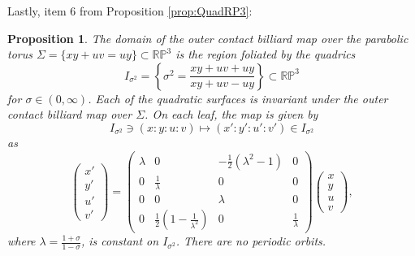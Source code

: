 \documentclass{article}
\newtheorem{prop}{Proposition}[section]
\begin{document}
\begin{appendix}



Lastly, item 6 from Proposition \ref{prop:QuadRP3}:

\begin{prop}
\label{prop:ParTori}
    The domain of the outer contact billiard map over the parabolic torus $\Sigma = \{xy+uv = uy\}\subset \mathbb{RP}^3$ is the region foliated by the quadrics  
    \[I_{\sigma^2}=\left\{ \sigma^2 = \frac{xy + uv + uy}{xy + uv - uy} \right\}\subset \mathbb{RP}^3\]
    for $\sigma\in (0,\infty)$. Each of the quadratic surfaces is invariant under the outer contact billiard map over $\Sigma$. On each leaf, the map is given by 
    \[ I_{\sigma^2}\ni (x: y: u: v)\mapsto (x':y':u':v')\in I_{\sigma^2}\]
    as
    \[\begin{pmatrix}
        x'\\
        y'\\
        u'\\
        v'
    \end{pmatrix} = \begin{pmatrix}
        \lambda & 0 & -\frac12(\lambda^2 - 1) & 0\\
        0 & \frac{1}{\lambda} & 0 & 0\\
        0 & 0 & \lambda & 0\\
        0 & \frac12(1 - \frac{1}{\lambda^2}) & 0 & \frac{1}{\lambda}
    \end{pmatrix} \begin{pmatrix}
        x \\
        y \\
        u \\
        v
    \end{pmatrix},\]
    where $\lambda = \frac{1+\sigma}{1-\sigma}$, is constant on $I_{\sigma^2}$. There are no periodic orbits. 
\end{prop}

\end{appendix}
\end{document}
